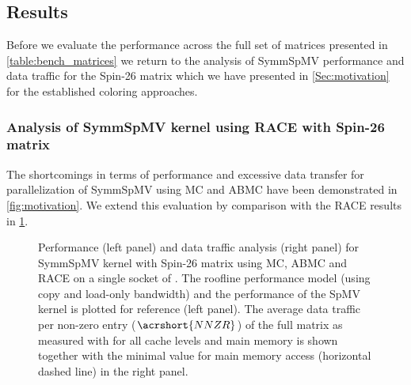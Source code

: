 \subsection{Results}
Before we evaluate the performance across the full set of matrices presented in \cref{table:bench_matrices} we return to the analysis of \acrshort{SymmSpMV} performance and data traffic for the Spin-26 matrix  which we have presented in \cref{Sec:motivation} for the established coloring approaches. 
%
\subsubsection{Analysis of \acrshort{SymmSpMV} kernel using RACE with Spin-26 matrix}
%
The shortcomings in terms of performance and excessive data transfer for parallelization of \acrshort{SymmSpMV} using MC and ABMC have been demonstrated in \cref{fig:motivation}. We extend this evaluation by comparison with the \acrshort{RACE} results in \cref{fig:motivation_w_RACE}.
 \begin{figure}[thbp]
 	\centering
 	\hspace{1em}
 	\caption{Performance (left panel) and data traffic analysis (right panel) for \acrshort{SymmSpMV} kernel with Spin-26 matrix using \acrshort{MC}, \acrshort{ABMC} and \acrshort{RACE} on a single socket of \IVB. The roofline performance model (using copy and load-only bandwidth) and the performance of the \acrshort{SpMV} kernel is plotted for reference (left panel). The average data traffic per non-zero entry ($\acrshort{NNZR}$) of the full matrix as measured with \LIKWID for all cache levels and main memory is shown together with the minimal value for main memory access (horizontal dashed line) in the right panel.}
 	\label{fig:motivation_w_RACE}
 \end{figure}
